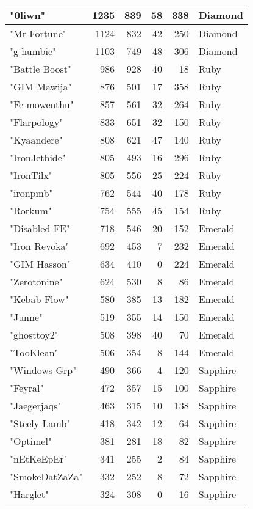 \documentclass{article}
\begin{document}
\begin{table}[htbp]
\begin{tabular}{|l|r|r|r|r|l|}
"0liwn" & 1235 & 839 & 58 & 338 & Diamond \\ \hline
"Mr Fortune" & 1124 & 832 & 42 & 250 & Diamond \\ \hline
"g humbie" & 1103 & 749 & 48 & 306 & Diamond \\ \hline
"Battle Boost" & 986 & 928 & 40 & 18 & Ruby \\ \hline
"GIM Mawija" & 876 & 501 & 17 & 358 & Ruby \\ \hline
"Fe mowenthu" & 857 & 561 & 32 & 264 & Ruby \\ \hline
"Flarpology" & 833 & 651 & 32 & 150 & Ruby \\ \hline
"Kyaandere" & 808 & 621 & 47 & 140 & Ruby \\ \hline
"IronJethide" & 805 & 493 & 16 & 296 & Ruby \\ \hline
"IronTilx" & 805 & 556 & 25 & 224 & Ruby \\ \hline
"ironpmb" & 762 & 544 & 40 & 178 & Ruby \\ \hline
"Rorkum" & 754 & 555 & 45 & 154 & Ruby \\ \hline
"Disabled FE" & 718 & 546 & 20 & 152 & Emerald \\ \hline
"Iron Revoka" & 692 & 453 & 7 & 232 & Emerald \\ \hline
"GIM Hasson" & 634 & 410 & 0 & 224 & Emerald \\ \hline
"Zerotonine" & 624 & 530 & 8 & 86 & Emerald \\ \hline
"Kebab Flow" & 580 & 385 & 13 & 182 & Emerald \\ \hline
"Junne" & 519 & 355 & 14 & 150 & Emerald \\ \hline
"ghosttoy2" & 508 & 398 & 40 & 70 & Emerald \\ \hline
"TooKlean" & 506 & 354 & 8 & 144 & Emerald \\ \hline
"Windows Grp" & 490 & 366 & 4 & 120 & Sapphire \\ \hline
"Feyral" & 472 & 357 & 15 & 100 & Sapphire \\ \hline
"Jaegerjaqs" & 463 & 315 & 10 & 138 & Sapphire \\ \hline
"Steely Lamb" & 418 & 342 & 12 & 64 & Sapphire \\ \hline
"Optimel" & 381 & 281 & 18 & 82 & Sapphire \\ \hline
"nEtKeEpEr" & 341 & 255 & 2 & 84 & Sapphire \\ \hline
"SmokeDatZaZa" & 332 & 252 & 8 & 72 & Sapphire \\ \hline
"Harglet" & 324 & 308 & 0 & 16 & Sapphire \\ \hline

\end{tabular}
\end{table}
\end{document}
